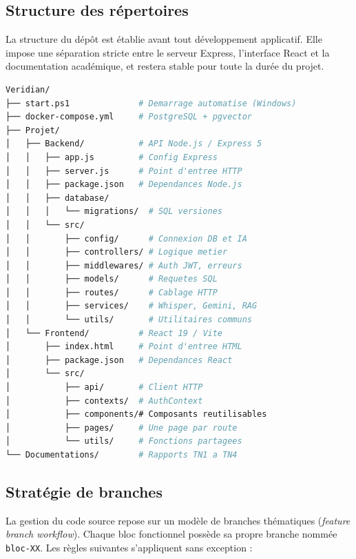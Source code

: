 \documentclass[12pt, a4paper]{article}
\begin{document}
\subsection{Structure des répertoires}

La structure du dépôt est établie avant tout développement
applicatif. Elle impose une séparation stricte entre le serveur
Express, l'interface React et la documentation académique,
et restera stable pour toute la durée du projet.

\begin{lstlisting}[language=bash, caption={Arborescence planifiée du dépôt Veridian}]
Veridian/
├── start.ps1              # Demarrage automatise (Windows)
├── docker-compose.yml     # PostgreSQL + pgvector
├── Projet/
│   ├── Backend/           # API Node.js / Express 5
│   │   ├── app.js         # Config Express
│   │   ├── server.js      # Point d'entree HTTP
│   │   ├── package.json   # Dependances Node.js
│   │   ├── database/
│   │   │   └── migrations/  # SQL versiones
│   │   └── src/
│   │       ├── config/      # Connexion DB et IA
│   │       ├── controllers/ # Logique metier
│   │       ├── middlewares/ # Auth JWT, erreurs
│   │       ├── models/      # Requetes SQL
│   │       ├── routes/      # Cablage HTTP
│   │       ├── services/    # Whisper, Gemini, RAG
│   │       └── utils/       # Utilitaires communs
│   └── Frontend/          # React 19 / Vite
│       ├── index.html     # Point d'entree HTML
│       ├── package.json   # Dependances React
│       └── src/
│           ├── api/       # Client HTTP
│           ├── contexts/  # AuthContext
│           ├── components/# Composants reutilisables
│           ├── pages/     # Une page par route
│           └── utils/     # Fonctions partagees
└── Documentations/        # Rapports TN1 a TN4

\end{lstlisting}

\subsection{Stratégie de branches}

La gestion du code source repose sur un modèle de branches
thématiques (\textit{feature branch workflow}). Chaque bloc
fonctionnel possède sa propre branche nommée \texttt{bloc-XX}.
Les règles suivantes s'appliquent sans exception :
\end{document}
